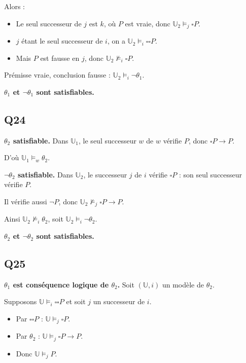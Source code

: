 \documentclass[11pt,a4paper]{article}
\providecommand{\tightlist}{\setlength{\itemsep}{0pt}\setlength{\parskip}{0pt}}
\providecommand{\Box}{\square}
\begin{document}
Alors :

\begin{itemize}
\tightlist
\item
  Le seul successeur de \(j\) est \(k\), où \(P\) est vraie, donc \(\mathbb U_2\models_j\Box P\).
\item
  \(j\) étant le seul successeur de \(i\), on a \(\mathbb U_2\models_i\Box\Box P\).
\item
  Mais \(P\) est fausse en \(j\), donc \(\mathbb U_2\not\models_i\Box P\).
\end{itemize}

Prémisse vraie, conclusion fausse : \(\mathbb U_2\models_i\neg\theta_1\).

\textbf{\(\theta_1\) et \(\neg\theta_1\) sont satisfiables.}

\hypertarget{q24}{%
\subsection{Q24}\label{q24}}

\textbf{\(\theta_2\) satisfiable.} Dans \(\mathbb U_1\), le seul successeur \(w\) de \(w\) vérifie \(P\), donc \(\Box P\to P\).

D'où \(\mathbb U_1\models_w\theta_2\).

\textbf{\(\neg\theta_2\) satisfiable.} Dans \(\mathbb U_2\), le successeur \(j\) de \(i\) vérifie \(\Box P\) : son seul successeur vérifie \(P\).

Il vérifie aussi \(\neg P\), donc \(\mathbb U_2\not\models_j\Box P\to P\).

Ainsi \(\mathbb U_2\not\models_i\theta_2\), soit \(\mathbb U_2\models_i\neg\theta_2\).

\textbf{\(\theta_2\) et \(\neg\theta_2\) sont satisfiables.}

\hypertarget{q25}{%
\subsection{Q25}\label{q25}}

\textbf{\(\theta_1\) est conséquence logique de \(\theta_2\).} Soit \((\mathbb U,i)\) un modèle de \(\theta_2\).

Supposons \(\mathbb U\models_i\Box\Box P\) et soit \(j\) un successeur de \(i\).

\begin{itemize}
\tightlist
\item
  Par \(\Box\Box P\) : \(\mathbb U\models_j\Box P\).
\item
  Par \(\theta_2\) : \(\mathbb U\models_j\Box P\to P\).
\item
  Donc \(\mathbb U\models_j P\).
\end{itemize}
\end{document}
